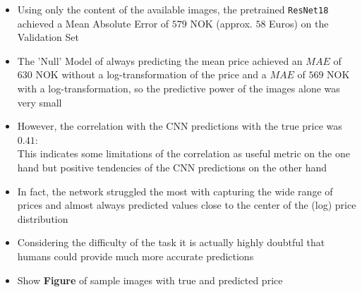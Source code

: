 \documentclass[12pt, letterpaper]{article}
\begin{document}
\begin{itemize}
    \item Using only the content of the available images, the pretrained \texttt{ResNet18} achieved a Mean Absolute Error of $579$ NOK (approx. $58$ Euros) on the Validation Set
    \item The 'Null' Model of always predicting the mean price achieved an $MAE$ of $630$ NOK without a log-transformation of the price and a $MAE$ of $569$ NOK with a log-transformation, so the predictive power of the images alone was very small
    \item However, the correlation with the CNN predictions with the true price was $0.41$: \\
          This indicates some limitations of the correlation as useful metric on the one hand but positive tendencies of the CNN predictions on the other hand
    \item In fact, the network struggled the most with capturing the wide range of prices and almost always predicted values close to the center of the (log) price distribution
    \item Considering the difficulty of the task it is actually highly doubtful that humans could provide much more accurate predictions
    \item Show \textbf{Figure} of sample images with true and predicted price
\end{itemize}

\newpage



\end{document}
